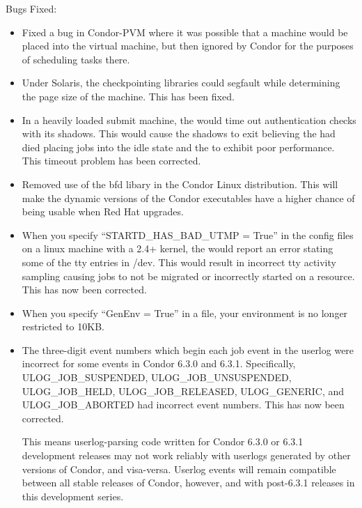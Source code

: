 \noindent Bugs Fixed:

\begin{itemize}

\item
Fixed a bug in Condor-PVM where it was possible that a machine would be 
placed into the virtual machine, but then ignored by Condor for the purposes
of scheduling tasks there.

\item
Under Solaris, the checkpointing libraries could segfault while determining
the page size of the machine. 
This has been fixed.

\item
In a heavily loaded submit machine, the  would time out
authentication checks with its shadows. 
This would cause the shadows to
exit believing the  had died placing jobs into the idle
state and the  to exhibit poor performance.
This timeout problem has been corrected.

\item
Removed use of the bfd libary in the Condor Linux distribution. 
This will make the dynamic versions of the Condor executables have a
higher chance of being usable when Red Hat upgrades.

\item
When you specify ``STARTD\_HAS\_BAD\_UTMP = True'' in the config files
on a linux machine with a 2.4+ kernel, the  would report
an error stating some of the tty entries in /dev. This would result
in incorrect tty activity sampling causing jobs to not be migrated or
incorrectly started on a resource. This has now been corrected.

\item 
When you specify ``GenEnv = True'' in a  file,
your environment is no longer restricted to 10KB.

\item
The three-digit event numbers which begin each job event in the
userlog were incorrect for some events in Condor 6.3.0 and 6.3.1.
Specifically, ULOG\_JOB\_SUSPENDED, ULOG\_JOB\_UNSUSPENDED,
ULOG\_JOB\_HELD, ULOG\_JOB\_RELEASED, ULOG\_GENERIC, and
ULOG\_JOB\_ABORTED had incorrect event numbers.  This has now been
corrected.

\Note This means userlog-parsing code written for Condor 6.3.0 or
6.3.1 development releases may not work reliably with userlogs
generated by other versions of Condor, and visa-versa.  Userlog events
will remain compatible between all stable releases of Condor, however,
and with post-6.3.1 releases in this development series.


\end{itemize}
